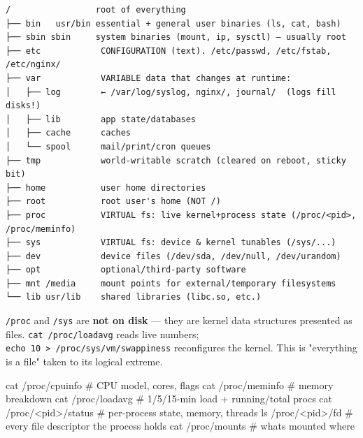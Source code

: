 \documentclass[11pt]{article}
\newenvironment{Shaded}{\begin{snugshade}}{\end{snugshade}}
\newcommand{\CommentTok}[1]{\textcolor[rgb]{0.48,0.49,0.49}{#1}}
\newcommand{\FunctionTok}[1]{\textcolor[rgb]{0.56,0.27,0.68}{#1}}
\newcommand{\NormalTok}[1]{\textcolor[rgb]{0.81,0.81,0.76}{#1}}
\newcommand{\OperatorTok}[1]{\textcolor[rgb]{0.81,0.81,0.76}{#1}}
\begin{document}
\setcodelang{}

\begin{verbatim}
/                 root of everything
├── bin   usr/bin essential + general user binaries (ls, cat, bash)
├── sbin sbin     system binaries (mount, ip, sysctl) — usually root
├── etc            CONFIGURATION (text). /etc/passwd, /etc/fstab, /etc/nginx/
├── var            VARIABLE data that changes at runtime:
│   ├── log        ← /var/log/syslog, nginx/, journal/  (logs fill disks!)
│   ├── lib        app state/databases
│   ├── cache      caches
│   └── spool      mail/print/cron queues
├── tmp            world-writable scratch (cleared on reboot, sticky bit)
├── home           user home directories
├── root           root user's home (NOT /)
├── proc           VIRTUAL fs: live kernel+process state (/proc/<pid>, /proc/meminfo)
├── sys            VIRTUAL fs: device & kernel tunables (/sys/...)
├── dev            device files (/dev/sda, /dev/null, /dev/urandom)
├── opt            optional/third-party software
├── mnt /media     mount points for external/temporary filesystems
└── lib usr/lib    shared libraries (libc.so, etc.)
\end{verbatim}

\texttt{/proc} and \texttt{/sys} are \textbf{not on disk} --- they are kernel data structures presented as files. \texttt{cat\ /proc/loadavg} reads live numbers; \texttt{echo\ 10\ \textgreater{}\ /proc/sys/vm/swappiness} reconfigures the kernel. This is "everything is a file" taken to its logical extreme.


\begin{Shaded}
\begin{Highlighting}[]
\FunctionTok{cat}\NormalTok{ /proc/cpuinfo      }\CommentTok{\# CPU model, cores, flags}
\FunctionTok{cat}\NormalTok{ /proc/meminfo      }\CommentTok{\# memory breakdown}
\FunctionTok{cat}\NormalTok{ /proc/loadavg      }\CommentTok{\# 1/5/15{-}min load + running/total procs}
\FunctionTok{cat}\NormalTok{ /proc/}\OperatorTok{\textless{}}\NormalTok{pid}\OperatorTok{\textgreater{}}\NormalTok{/status }\CommentTok{\# per{-}process state, memory, threads}
\FunctionTok{ls}\NormalTok{  /proc/}\OperatorTok{\textless{}}\NormalTok{pid}\OperatorTok{\textgreater{}}\NormalTok{/fd     }\CommentTok{\# every file descriptor the process holds}
\FunctionTok{cat}\NormalTok{ /proc/mounts       }\CommentTok{\# what\textquotesingle{}s mounted where}
\end{Highlighting}
\end{Shaded}
\end{document}
